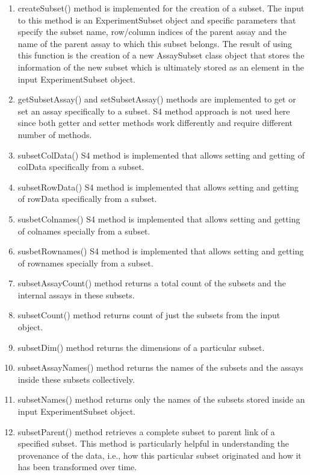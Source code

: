 \documentclass[
]{article}
\providecommand{\tightlist}{%
  \setlength{\itemsep}{0pt}\setlength{\parskip}{0pt}}
\begin{document}
\begin{enumerate}
\def\labelenumi{\arabic{enumi}.}
\tightlist
\item
  createSubset() method is implemented for the creation of a subset. The
  input to this method is an ExperimentSubset object and specific
  parameters that specify the subset name, row/column indices of the
  parent assay and the name of the parent assay to which this subset
  belongs. The result of using this function is the creation of a new
  AssaySubset class object that stores the information of the new subset
  which is ultimately stored as an element in the input ExperimentSubset
  object.
\item
  getSubsetAssay() and setSubsetAssay() methods are implemented to get
  or set an assay specifically to a subset. S4 method approach is not
  used here since both getter and setter methods work differently and
  require different number of methods.
\item
  subsetColData() S4 method is implemented that allows setting and
  getting of colData specifically from a subset.
\item
  subsetRowData() S4 method is implemented that allows setting and
  getting of rowData specifically from a subset.
\item
  susbetColnames() S4 method is implemented that allows setting and
  getting of colnames specially from a subset.
\item
  susbetRownames() S4 method is implemented that allows setting and
  getting of rownames specially from a subset.
\item
  subsetAssayCount() method returns a total count of the subsets and the
  internal assays in these subsets.
\item
  subsetCount() method returns count of just the subsets from the input
  object.
\item
  subsetDim() method returns the dimensions of a particular subset.
\item
  subsetAssayNames() method returns the names of the subsets and the
  assays inside these subsets collectively.
\item
  subsetNames() method returns only the names of the subsets stored
  inside an input ExperimentSubset object.
\item
  subsetParent() method retrieves a complete subset to parent link of a
  specified subset. This method is particularly helpful in understanding
  the provenance of the data, i.e., how this particular subset
  originated and how it has been transformed over time.

\end{enumerate}
\end{document}
